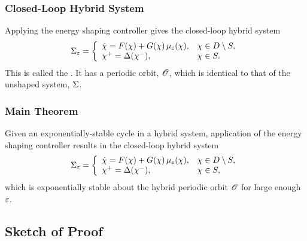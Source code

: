 \begin{frame}[t]
  \frametitle{Closed-Loop Hybrid System}
  Applying the energy shaping controller gives the closed-loop hybrid system
  \begin{align*}
    \Sigma_{\varepsilon} = \left\{
      \begin{array}{l l}
        {\dot {\chi}} = F(\chi) + G(\chi) \, \mu_{\varepsilon}(\chi), & \chi \in D \setminus S,\\
        \chi^{+} = \Delta(\chi^{-}), & \chi \in S.
      \end{array}\right.
  \end{align*}
  This is called the . It has a periodic orbit, $\mathscr O$,
  which is identical to that of the unshaped system, $\Sigma$.
\end{frame}


\begin{frame}[t]
  \frametitle{Main Theorem}

  \begin{theorem}
    Given an exponentially-stable cycle in a hybrid system, application
    of the energy shaping controller results in the closed-loop hybrid system
    \begin{align*}
      \Sigma_{\varepsilon} = \left\{
      \begin{array}{l l}
        {\dot {\chi}} = F(\chi) + G(\chi) \, \mu_{\varepsilon}(\chi), & \chi \in D \setminus S,\\
        \chi^{+} = \Delta(\chi^{-}), & \chi \in S,
      \end{array}\right.
  \end{align*}
  which is exponentially stable about the hybrid periodic orbit $\mathscr O$ for
  large enough $\varepsilon$.
  
  \end{theorem}
\end{frame}

\subsection{Sketch of Proof}

